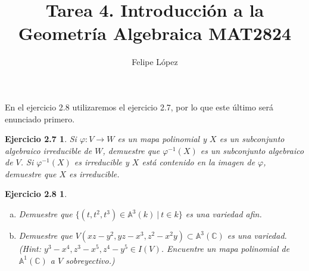 \documentclass[12pt,a4paper]{article}
\title{Tarea 4. Introducción a la Geometría Algebraica MAT2824}
\author{Felipe López}
\theoremstyle{plain}
\newtheorem*{ejercicio1}{Ejercicio 2.8}
\newtheorem*{ejercicio27}{Ejercicio 2.7}
\newcommand{\C}{\mathbb{C}}
\begin{document}
\maketitle

En el ejercicio 2.8 utilizaremos el ejercicio 2.7, por lo que este último será enunciado primero.

\begin{ejercicio27}
	Si $\varphi \colon V \to W$ es un mapa polinomial y $X$ es un subconjunto algebraico irreducible de $W$, demuestre que $\varphi^{-1}(X)$ es un subconjunto algebraico de $V$. Si $\varphi^{-1}(X)$ es irreducible y $X$ está contenido en la imagen de $\varphi$, demuestre que $X$ es irreducible.
\end{ejercicio27}

\begin{ejercicio1}
	\begin{enumerate}[(a)]
		\item Demuestre que $\{(t,t^{2},t^{3}) \in \mathbb{A}^{3}(k) \ | \ t \in k\}$ es una variedad afin.

		\item Demuestre que $V(xz - y^{2}, yz - x^{3}, z^{2} - x^{2}y) \subset \mathbb{A}^{3}(\C)$ es una variedad. (Hint: $y^{3} - x^{4}, z^{3} - x^{5}, z^{4} - y^{5} \in I(V)$. Encuentre un mapa polinomial de $\mathbb{A}^{1}(\C)$ a $V$ sobreyectivo.)
	\end{enumerate}
\end{ejercicio1}
\end{document}
